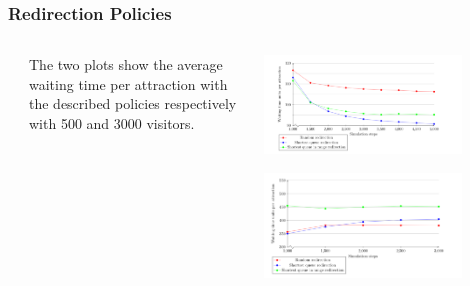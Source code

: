 \begin{frame}
    \frametitle{Redirection Policies}
    \begin{columns}
        \begin{column}{0.1\textwidth}
        \end{column}
        \begin{column}{0.3\textwidth}
            The two plots show the average waiting time per attraction with the described policies respectively with 500 and 3000 visitors.
        \end{column}
        \begin{column}{0.7\textwidth}
            \begin{center}
                \includegraphics[width=0.8\textwidth]{../img/ratio-500}
                \label{fig:ratio-500}
            \end{center}
            \begin{center}
                \includegraphics[width=0.8\textwidth]{../img/ratio-3000}
                \label{fig:ratio-3000}
            \end{center}
        \end{column}
    \end{columns}
\end{frame}

